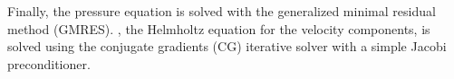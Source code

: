 \documentclass{sig-alternate}
\begin{document}
Finally, the pressure equation is solved with the generalized minimal residual 
method (GMRES). , the Helmholtz equation for the 
velocity components, is solved using the conjugate gradients (CG) iterative solver with a simple Jacobi preconditioner.
\end{document}
